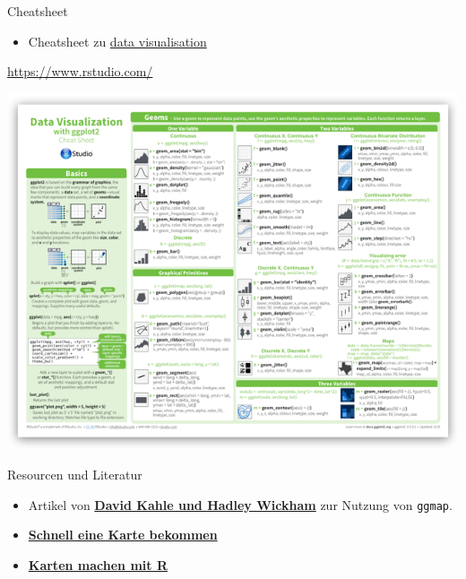 \documentclass[ignorenonframetext,]{beamer}
\providecommand{\tightlist}{%
  \setlength{\itemsep}{0pt}\setlength{\parskip}{0pt}}
\begin{document}
\begin{frame}{Cheatsheet}
\protect\hypertarget{cheatsheet}{}

\begin{itemize}
\tightlist
\item
  Cheatsheet zu
  \href{https://www.rstudio.com/wp-content/uploads/2015/04/ggplot2-cheatsheet.pdf}{data
  visualisation}
\end{itemize}

\url{https://www.rstudio.com/}

\includegraphics{figure/ggplot2-cheatsheet.png}

\end{frame}

\begin{frame}[fragile]{Resourcen und Literatur}
\protect\hypertarget{resourcen-und-literatur}{}

\begin{itemize}
\item
  Artikel von
  \href{http://journal.r-project.org/archive/2013-1/kahle-wickham.pdf}{\textbf{David
  Kahle und Hadley Wickham}} zur Nutzung von \texttt{ggmap}.
\item
  \href{http://rpackages.ianhowson.com/cran/ggmap/man/get_map.html}{\textbf{Schnell
  eine Karte bekommen}}
\item
  \href{http://www.kevjohnson.org/making-maps-in-r-part-2/}{\textbf{Karten
  machen mit R}}
\end{itemize}

\end{frame}
\end{document}
